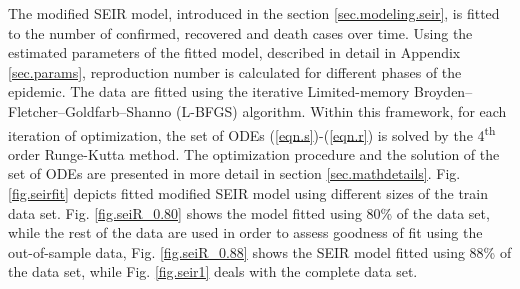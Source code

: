 \documentclass[conference]{IEEEtran}
\begin{document}
The modified SEIR model, introduced in the section \ref{sec.modeling.seir}, is fitted to the number of confirmed, recovered and death cases over time. Using the estimated parameters of the fitted model, described in detail in Appendix \ref{sec.params}, reproduction number is calculated for different phases of the epidemic. The data are fitted using the iterative Limited-memory Broyden–Fletcher–Goldfarb–Shanno (L-BFGS) algorithm. Within this framework, for each iteration of optimization, the set of ODEs (\ref{eqn.s})-(\ref{eqn.r}) is solved by the 4\textsuperscript{th} order Runge-Kutta method. The optimization procedure and the solution of the set of ODEs are presented in more detail in section \ref{sec.mathdetails}. Fig. \ref{fig.seirfit} depicts fitted modified SEIR model using different sizes of the train data set. Fig. \ref{fig.seiR_0.80} shows the model fitted using 80\% of the data set, while the rest of the data are used in order to assess goodness of fit using the out-of-sample data, Fig. \ref{fig.seiR_0.88} shows the SEIR model fitted using 88\% of the data set, while Fig. \ref{fig.seir1} deals with the complete data set.
\end{document}
